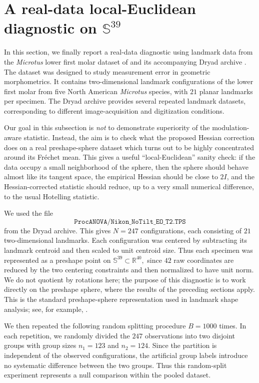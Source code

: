 \documentclass{amsart}
\theoremstyle{definition}
\theoremstyle{remark}
\newcommand\0{\boldsymbol{0}}
\begin{document}
\section{A real-data local-Euclidean diagnostic on \texorpdfstring{\(\mathbb S^{39}\)}{S39}}
\label{subsec:microtus-real-data-diagnostic}

In this section, we finally report a real-data diagnostic using landmark data from the
\textit{Microtus} lower first molar dataset of \citet{FoxVeneracionBlois2020}
and its accompanying Dryad archive \citep{FoxVeneracionBlois2020Dataset}.  The
dataset was designed to study measurement error in geometric morphometrics.
It contains two-dimensional landmark configurations of the lower first molar
from five North American \textit{Microtus} species, with \(21\) planar landmarks
per specimen.  The Dryad archive provides several repeated landmark datasets,
corresponding to different image-acquisition and digitization conditions.

Our goal in this subsection is \textit{not} to demonstrate superiority of the
modulation-aware statistic.  Instead, the aim is to check what the proposed
Hessian correction does on a real preshape-sphere dataset which turns out to be
highly concentrated around its Fr\'echet mean.  This gives a useful
``local-Euclidean'' sanity check: if the data occupy a small neighborhood of the
sphere, then the sphere should behave almost like its tangent space, the
empirical Hessian should be close to \(2I\), and the Hessian-corrected statistic
should reduce, up to a very small numerical difference, to the usual Hotelling
statistic.

We used the file
\[
\texttt{ProcANOVA/Nikon\_NoTilt\_EO\_T2.TPS}
\]
from the Dryad archive.  This gives \(N=247\) configurations, each consisting of
\(21\) two-dimensional landmarks.  Each configuration was centered by subtracting
its landmark centroid and then scaled to unit centroid size.  Thus each specimen
was represented as a preshape point on
\(
\mathbb S^{39}\subset \mathbb R^{40},
\)
since \(42\) raw coordinates are reduced by the two centering constraints and
then normalized to have unit norm.  We do not quotient by rotations here; the
purpose of this diagnostic is to work directly on the preshape sphere, where the
results of the preceding sections apply.  This is the standard preshape-sphere
representation used in landmark shape analysis; see, for example,
\citet{DrydenMardia2016}.

We then repeated the following random splitting procedure \(B=1000\) times.
In each repetition, we randomly divided the \(247\) observations into two disjoint groups with group sizes \(n_1=123\) and \(n_2=124\).  Since the partition is independent of the observed configurations, the artificial group labels introduce no systematic difference between the two groups. Thus this random-split experiment represents a null comparison within
the pooled dataset.
\end{document}
